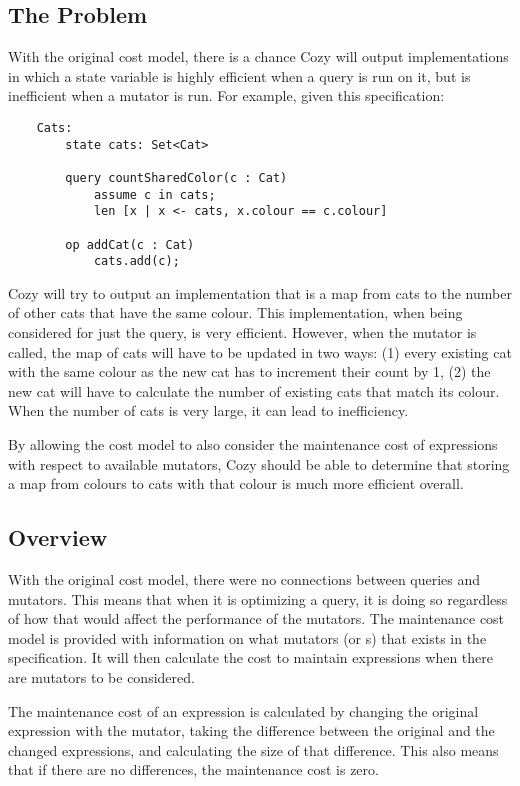 \subsection{The Problem}
With the original cost model, there is a chance Cozy will output implementations
in which a state variable is highly efficient when a query is run on it, but
is inefficient when a mutator is run. For example, given this specification:

\begin{lstlisting}
    Cats:
        state cats: Set<Cat>

        query countSharedColor(c : Cat)
            assume c in cats;
            len [x | x <- cats, x.colour == c.colour]

        op addCat(c : Cat)
            cats.add(c);
\end{lstlisting}

Cozy will try to output an implementation that is a map from cats to the number
of other cats that have the same colour. This implementation, when being
considered for just the query, is very efficient. However, when the mutator
 is called, the map of cats will have to be updated in two ways:
(1) every existing cat with the same colour as the new cat has to increment their
count by 1, (2) the new cat will have to calculate the number of existing cats
that match its colour. When the number of cats is very large, it can lead to
inefficiency.

By allowing the cost model to also consider the maintenance cost of expressions
with respect to available mutators, Cozy should be able to determine that storing
a map from colours to cats with that colour is much more efficient overall.

\subsection{Overview}
With the original cost model, there were no connections between queries and
mutators. This means that when it is optimizing a query, it is doing so
regardless of how that would affect the performance of the mutators.
The maintenance cost model is provided with information on what mutators (or
s) that exists in the specification. It will then calculate the cost to
maintain expressions when there are mutators to be considered.

The maintenance cost of an expression is calculated by changing the original
expression with the mutator, taking the difference between the original and the
changed expressions, and calculating the size of that difference. This also
means that if there are no differences, the maintenance cost is zero.

